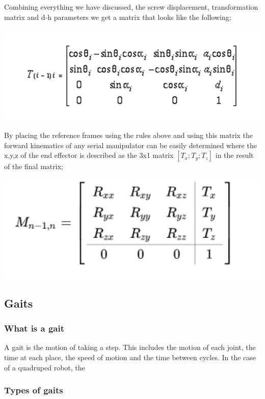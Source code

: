     Combining everything we have discussed, the screw displacement, transformation matrix and d-h parameters we get a matrix that looks like the following;
    \begin{center}
    \includegraphics[width=150mm]{Matrizx.PNG}
    \end{center}
    By placing the reference frames using the rules above and using this matrix the forward kinematics of any serial manipulator can be easily determined where the x,y,z of the end effector is described as the 3x1 matrix $[T_x; T_y; T_z]$ in the result of the final matrix; 
     \begin{center}
    \includegraphics[width=150mm]{Matrix2.PNG}
    \end{center}
    
\subsection{Gaits}
    \subsubsection{What is a gait}
    A gait is the motion of taking  a step. This includes the motion of each joint, the time at each place, the speed of motion and the time between cycles. In the case of a quadruped robot, the 
    
    \subsubsection{Types of gaits}
    




